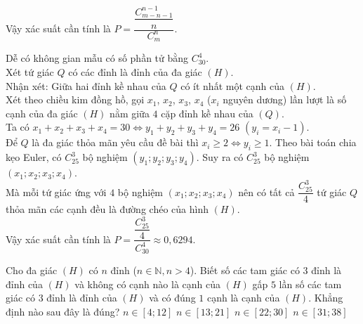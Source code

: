 \begin{vd}
{\begin{tongquat}
			Vậy xác suất  cần tính là $P=\dfrac{\dfrac{C_{m-n-1}^{n-1}}{n}}{C_{m}^n}$.
		\end{tongquat}
		\noindent
		Dễ có không gian mẫu có số phần tử bằng $C_{30}^4$.\\
		Xét tứ giác $Q$ có các đỉnh là đỉnh của đa giác $(H)$. \\
		Nhận xét: Giữa hai đỉnh kề nhau của $Q$ có ít nhất một cạnh của $(H)$.\\ 
		Xét theo chiều kim đồng hồ, gọi $x_1$, $x_2$, $x_3$, $x_4$ ($x_i$ nguyên dương) lần lượt là số cạnh của đa giác $(H)$ nằm giữa $4$ cặp đỉnh kề nhau  của $(Q)$. \\
		Ta có $x_1+x_2+x_3+x_4=30\Leftrightarrow y_1+y_2+y_3+y_4=26$ $(y_i=x_i-1)$. \\
		Để $Q$ là đa giác thỏa mãn yêu cầu đề bài thì $x_i\ge 2\Leftrightarrow y_i\ge 1$. Theo bài toán chia kẹo Euler, có $C_{25}^3$ bộ nghiệm $(y_1;y_2;y_3;y_4)$. Suy ra có $C_{25}^3$ bộ nghiệm $(x_1;x_2;x_3;x_4)$. \\
		Mà mỗi tứ giác ứng với $4$ bộ nghiệm $(x_1;x_2;x_3;x_4)$ nên có tất cả $\dfrac{C_{25}^3}{4}$ tứ giác $Q$ thỏa mãn các cạnh đều là đường chéo của hình $(H)$. \\
		Vậy xác suất  cần tính là $P=\dfrac{\dfrac{C_{25}^3}{4}}{C_{30}^4}\approx 0{,}6294$.
	}
\end{vd}

\begin{bt}%
	Cho đa giác $(H)$ có $n$ đỉnh ($n \in \mathbb{N}, n > 4$). Biết số các tam giác có $3$ đỉnh là đỉnh của $(H)$ và không có cạnh nào là cạnh của $(H)$ gấp $5$ lần số các tam giác có $3$ đỉnh là đỉnh của $(H)$ và có đúng $1$ cạnh là cạnh của $(H)$. Khẳng định nào sau đây là đúng?
	\choice
	{$n\in\left[4;12\right]$}
	{$n\in\left[13;21\right]$}
	{$n\in\left[22;30\right]$}
	{\True $n\in\left[31;38\right]$}
\end{bt}

